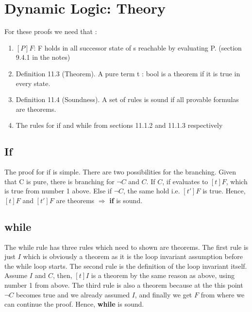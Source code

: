 \documentclass[11pt, oneside]{article}   	%
\begin{document}
\section{Dynamic Logic: Theory}

For these proofs we need that :

\begin{enumerate}
\item $[P]F$: F holds in all successor state of s reachable by evaluating P. (section 9.4.1 in the notes)
\item Definition 11.3 (Theorem). A pure term t : bool is a theorem if it is true in every state.
\item Definition 11.4 (Soundness). A set of rules is sound if all provable formulas are theorems.
\item The rules for if and while from sections 11.1.2 and 11.1.3 respectively
\end{enumerate}

\subsection{If}

The proof for if is simple. There are two possibilities for the branching. Given that C is pure, there is branching for $\neg C$ and $C$. If $C$, if evaluates to $[t]F$, which is true from number 1 above. Else if $\neg C$, the same hold i.e. $[t']F$ is true. Hence, $[t]F$ and  $[t']F$ are theorems $\Rightarrow$ \textbf{if} is sound.

\subsection{while}


The while rule has three rules which need to shown are theorems. The first rule is just $I$ which is obviously a theorem as it is the loop invariant assumption before the while loop starts. The second rule is the definition of the loop invariant itself. Assume $I$ and $C$, then, $[t]I$ is a theorem by the same reason as above, using number 1 from above. The third rule is also a theorem because at the this point $\neg C$ becomes true and we already assumed $I$, and finally we get $F$ from where we can continue the proof. Hence, \textbf{while} is sound.
\end{document}
